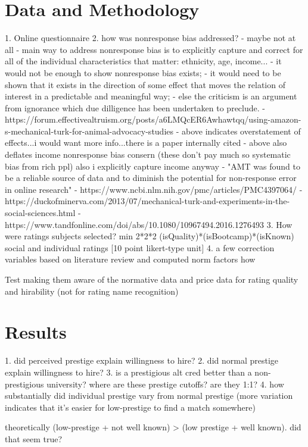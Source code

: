 \documentclass[review]{elsarticle}
\begin{document}
\section{Data and Methodology}

1. Online questionnaire
2. how was nonresponse bias addressed? - maybe not at all
- main way to address nonresponse bias is to explicitly capture and correct for all of the individual characteristics that matter: ethnicity, age, income...
- it would not be enough to show nonresponse bias exists;
- it would need to be shown that it exists in the direction of some effect that moves the relation of interest in a predictable and meaningful way;
- else the criticism is an argument from ignorance which due dilligence has been undertaken to preclude.
- https://forum.effectivealtruism.org/posts/a6LMQcER6Awhawtqq/using-amazon-s-mechanical-turk-for-animal-advocacy-studies
- above indicates overstatement of effects...i would want more info...there is a paper internally cited
- above also deflates income nonresponse bias consern (these don't pay much so systematic bias from rich ppl) also i explicitly capture income anyway
- "AMT was found to be a reliable source of data and to diminish the potential for non-response error in online research"
- https://www.ncbi.nlm.nih.gov/pmc/articles/PMC4397064/
- https://duckofminerva.com/2013/07/mechanical-turk-and-experiments-in-the-social-sciences.html
- https://www.tandfonline.com/doi/abs/10.1080/10967494.2016.1276493
3. How were ratings subjects selected? min 2*2*2 (isQuality)*(isBootcamp)*(isKnown) social and individual ratings [10 point likert-type unit]
4. a few correction variables based on literature review and computed norm factors how

Test making them aware of the normative data and price data for rating quality and hirability (not for rating name recognition)

\section{Results}

1. did perceived prestige explain willingness to hire?
2. did normal prestige explain willingness to hire?
3. is a prestigious alt cred better than a non-prestigious university? where are these prestige cutoffs? are they 1:1?
4. how substantially did individual prestige vary from normal prestige (more variation indicates that it's easier for low-prestige to find a match somewhere)

theoretically (low-prestige + not well known) > (low prestige + well known). did that seem true?
\end{document}
